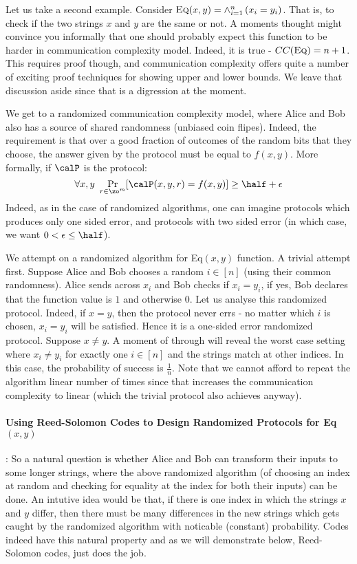 Let us take a second example. Consider $\textrm{\sc Eq}(x,y) = \land_{i=1}^n \left( x_i = y_i \right)$. That is, to check if the two strings $x$ and $y$ are the same or not. A moments thought might convince you informally that one should probably expect this function to be harder in communication complexity model. Indeed, it is true - $CC(\textrm{\sc Eq}) = n+1$. This requires proof though, and communication complexity offers quite a number of exciting proof techniques for showing upper and lower bounds. We leave that discussion aside since that is a digression at the moment.

We get to a randomized communication complexity model, where Alice and Bob also has a source of shared randomness (unbiased coin flipes). Indeed, the requirement is that over a good fraction of outcomes of the random bits that they choose, the answer given by the protocol must be equal to $f(x,y)$. More formally, if $\calP$ is the protocol:
$$\forall x,y ~\Pr_{r \in \zo^m} [ \calP(x,y,r) = f(x,y) ] \ge \half+\epsilon$$
Indeed, as in the case of randomized algorithms, one can imagine protocols which produces only one sided error, and protocols with two sided error (in which case, we want $0 < \epsilon \le \half$).

We attempt on a randomized algorithm for {\sc Eq}$(x,y)$ function. A trivial attempt first. Suppose Alice and Bob chooses a random $i \in [n]$ (using their common randomness). Alice sends across $x_i$ and Bob checks if $x_i = y_i$, if yes, Bob declares that the function value is $1$ and otherwise $0$. Let us analyse this randomized protocol. Indeed, if $x = y$, then the protocol never errs - no matter which $i$ is chosen, $x_i = y_i$ will be satisfied. Hence it is a one-sided error randomized protocol. Suppose $x \ne y$. A moment of through will reveal the worst case setting where $x_i \ne y_i$ for exactly one $i \in [n]$ and the strings match at other indices. In this case, the probability of success is $\frac{1}{n}$. Note that we cannot afford to repeat the algorithm linear number of times since that increases the communication complexity to linear (which the trivial protocol also achieves anyway).


\paragraph{Using Reed-Solomon Codes to Design Randomized Protocols for {\sc Eq}$(x,y)$}:
So a natural question is whether Alice and Bob can transform their inputs to some longer strings, where the above randomized algorithm (of choosing an index at random and checking for equality at the index for both their inputs) can be done. An intutive  idea would be that, if there is one index in which the strings $x$ and $y$ differ, then there must be many differences in the new strings which gets caught by the randomized algorithm with noticable (constant) probability. Codes indeed have this natural property and as we will demonstrate below, Reed-Solomon codes, just does the job.

